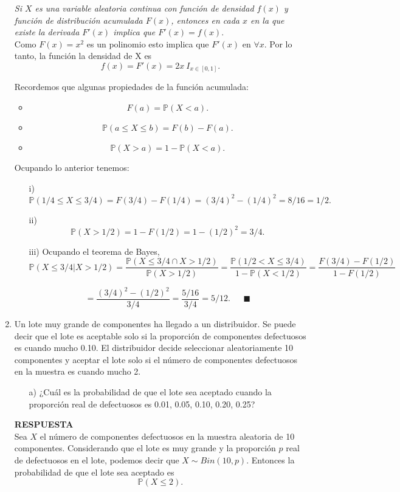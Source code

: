 \documentclass[11pt,letterpaper]{article}
\newcommand{\mP}{\mathbb{P}}
\newcommand{\res}{\textbf{RESPUESTA}\\}
\begin{document}
\begin{enumerate}
\textit{Si $X$ es una variable aleatoria continua con función de densidad $f(x)$ y función de distribución acumulada $F(x)$, entonces en cada $x$ en la que existe la derivada $F'(x)$ implica que $F'(x)=f(x).$}\\

Como $F(x)=x^2$ es un polinomio esto implica que $F'(x)$ en $\forall x$. Por lo tanto, la función la densidad de X es
$$f(x)=F'(x)=2x \ I_{x\in [0,1]}.$$

Recordemos que algunas propiedades de la función acumulada:
\begin{itemize}
\item $$F(a)=\mP(X<a).$$
\item $$\mP (a\leq X\leq b)= F(b)-F(a). $$
\item $$\mP(X>a)=1-\mP(X<a).$$
\end{itemize}
Ocupando lo anterior tenemos:

\begin{itemize}
\item[i)] 
$$\mP (1/4 \leq X \leq 3/4)= F(3/4)-F(1/4)= (3/4)^2-(1/4)^2=8/16=1/2.$$ 

\item[ii)]$$\mP(X > 1/2)= 1-F(1/2)=1-(1/2)^2=3/4.$$

\item[iii)]Ocupando el teorema de Bayes,
$$\mP(X \leq 3/4|X > 1/2)=\frac{\mP(X\leq 3/4 \cap X>1/2)}{\mP(X>1/2)}=\frac{\mP(1/2<X\leq3/4)}{1-\mP(X<1/2)}=\frac{F(3/4)-F(1/2)}{1-F(1/2)}$$

$$=\frac{(3/4)^2-(1/2)^2}{3/4} =\frac{5/16}{3/4}=5/12. \ \ \ \ \ \ \  \blacksquare$$
\end{itemize}

\item Un lote muy grande de componentes ha llegado a un distribuidor. Se puede decir que el
lote es aceptable solo si la proporción de componentes defectuosos es cuando mucho 0.10.
El distribuidor decide seleccionar aleatoriamente 10 componentes y aceptar el lote solo si el
número de componentes defectuosos en la muestra es cuando mucho 2.

\begin{itemize}
\item[a)] ¿Cuál es la probabilidad de que el lote sea aceptado cuando la proporción real de defectuosos es 0.01, 0.05, 0.10, 0.20, 0.25?
\end{itemize}

\res
Sea $X$ el número de componentes defectuosos en la muestra aleatoria de 10 componentes. Considerando que el lote es muy grande y la proporción $p$ real de defectuosos en el lote, podemos decir que $X\sim Bin(10,p)$. Entonces la probabilidad de que el lote sea aceptado es $$\mP(X\leq 2).$$


\end{enumerate}
\end{document}
